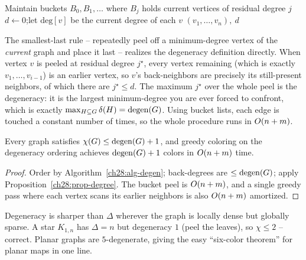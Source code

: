 \begin{algorithm}[H]
\caption{\textsc{DegeneracyOrder}$(\Gph)$ -- smallest-last ordering}
\label{ch28:alg-degen}
Maintain buckets $B_0,B_1,\dots$ where $B_j$ holds current vertices of residual degree $j$\;
$d \leftarrow 0$;\quad let $\mathrm{deg}[v]$ be the current degree of each $v$\;
\Return $(v_1,\dots,v_n),\ d$\;
\end{algorithm}

\begin{whybox}
The smallest-last rule -- repeatedly peel off a minimum-degree vertex of the
\emph{current} graph and place it last -- realizes the degeneracy definition
directly. When vertex $v$ is peeled at residual degree $j^\star$, every vertex
remaining (which is exactly $v_1,\dots,v_{i-1}$) is an earlier vertex, so $v$'s
back-neighbors are precisely its still-present neighbors, of which there are
$j^\star\le d$. The maximum $j^\star$ over the whole peel is the degeneracy: it is
the largest minimum-degree you are ever forced to confront, which is exactly
$\max_{H\subseteq G}\delta(H)=\operatorname{degen}(G)$. Using bucket lists, each edge is
touched a constant number of times, so the whole procedure runs in
$O(n+m)$.
\end{whybox}

\begin{corollary}
\label{ch28:cor-degen}
Every graph satisfies $\chi(G)\le \operatorname{degen}(G)+1$, and greedy coloring on the
degeneracy ordering achieves $\operatorname{degen}(G)+1$ colors in $O(n+m)$ time.
\end{corollary}

\begin{proof}
Order by Algorithm~\ref{ch28:alg-degen}; back-degrees are $\le\operatorname{degen}(G)$; apply
Proposition~\ref{ch28:prop-degree}. The bucket peel is $O(n+m)$, and a single greedy pass
where each vertex scans its earlier neighbors is also $O(n+m)$ amortized.
\end{proof}

Degeneracy is sharper than $\Delta$ wherever the graph is locally dense but
globally sparse. A star $K_{1,n}$ has $\Delta=n$ but degeneracy $1$ (peel the
leaves), so $\chi\le 2$ -- correct. Planar graphs are $5$-degenerate, giving the
easy ``six-color theorem'' for planar maps in one line.

